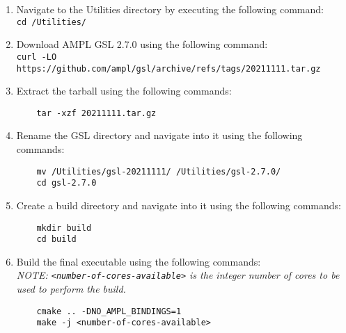 \begin{enumerate}
	\item Navigate to the Utilities directory by executing the following command: \\

	\texttt{cd /Utilities/}
	\item Download AMPL \ac{GSL} 2.7.0 using the following command:\\

	\texttt{curl -LO https://github.com/ampl/gsl/archive/refs/tags/20211111.tar.gz}

	\item Extract the tarball using the following commands:
	\begin{verbatim}
	tar -xzf 20211111.tar.gz
	\end{verbatim}
	\item Rename the GSL directory and navigate into it using the following commands:
	\begin{verbatim}
	mv /Utilities/gsl-20211111/ /Utilities/gsl-2.7.0/	
	cd gsl-2.7.0
	\end{verbatim}

	\item Create a build directory and navigate into it using the following commands:
	\begin{verbatim}
	mkdir build
	cd build
	\end{verbatim}
	
	\item Build the final executable using the following commands: \\
	\textit{NOTE: \texttt{<number-of-cores-available>} is the integer number of cores to be used to perform the build.}
	
	\begin{verbatim}
	cmake .. -DNO_AMPL_BINDINGS=1
	make -j <number-of-cores-available>
	\end{verbatim}
	
\end{enumerate}